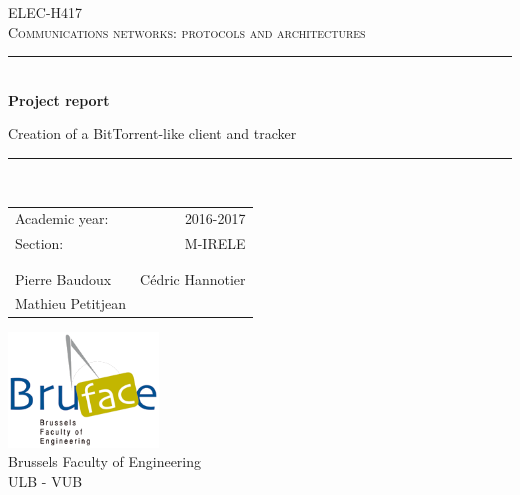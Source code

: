 \setlength{\parindent}{0cm}
\setlength{\parskip}{1ex plus 0.5ex minus 0.2ex}
\newcommand{\hsp}{\hspace{20pt}}
\newcommand{\HRule}{\rule{\linewidth}{0.5mm}}

\begin{titlepage}
  \begin{sffamily}
  \begin{center}

    \textsc{\Large ELEC-H417\\
    Communications networks: protocols and architectures}\\[4.6cm]

    \HRule \\[0.1cm]
    { \huge \bfseries Project report \\[0.4cm] }
    


{\Large Creation of a BitTorrent-like client and tracker\\}
\HRule
  \\[3cm]
\begin{center}
\begin{tabular}{l r}
Academic year: & 2016-2017 \\ %
Section: & M-IRELE\\
& \\ \\
Pierre Baudoux & Cédric Hannotier \\
Mathieu Petitjean
\end{tabular}
\end{center}

    \vfill
    \includegraphics[width=0.3\textwidth]{img/bruface_logo.png}\\[0.1in]
    \Large{Brussels Faculty of Engineering}\\
    \normalsize
    \textsc{ULB - VUB}\\

    \vspace{0.2cm}

  \end{center}
  \end{sffamily}
\end{titlepage}